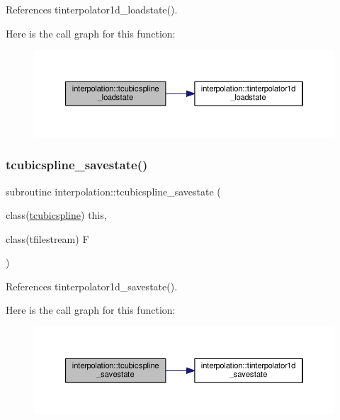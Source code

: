 References tinterpolator1d\+\_\+loadstate().

Here is the call graph for this function\+:
\nopagebreak
\begin{figure}[H]
\begin{center}
\leavevmode
\includegraphics[width=350pt]{namespaceinterpolation_abaeaf4f39b2dbd78b28a5e1802475739_cgraph}
\end{center}
\end{figure}
\mbox{\label{namespaceinterpolation_a45a1312a778961c9e5f843e2602c83ac}} 
\subsubsection{\texorpdfstring{tcubicspline\+\_\+savestate()}{tcubicspline\_savestate()}}
{\footnotesize\ttfamily subroutine interpolation\+::tcubicspline\+\_\+savestate (\begin{DoxyParamCaption}\item[{class(\mbox{\hyperlink{structinterpolation_1_1tcubicspline}{tcubicspline}})}]{this,  }\item[{class(tfilestream)}]{F }\end{DoxyParamCaption})}



References tinterpolator1d\+\_\+savestate().

Here is the call graph for this function\+:
\nopagebreak
\begin{figure}[H]
\begin{center}
\leavevmode
\includegraphics[width=350pt]{namespaceinterpolation_a45a1312a778961c9e5f843e2602c83ac_cgraph}
\end{center}
\end{figure}
\mbox{\label{namespaceinterpolation_a830b760c24924ee524054ca9f712d972}} 
